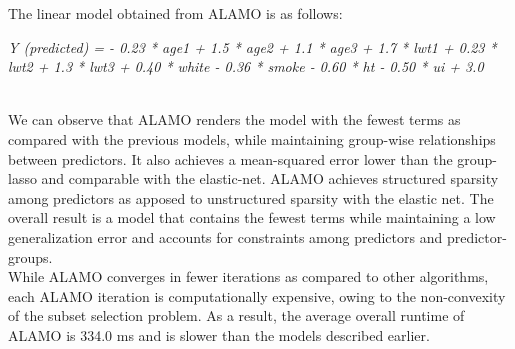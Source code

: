 \documentclass[a4paper,12pt]{article}
\begin{document}
\noindent The linear model obtained from ALAMO is as follows:
\\

\begin{center}
    \textit{Y (predicted) = - 0.23 * age1 + 1.5 * age2 + 1.1 * age3 + 1.7 * lwt1 + 0.23 * lwt2 + 1.3 * lwt3 + 0.40 * white - 0.36 * smoke - 0.60 * ht - 0.50 * ui + 3.0}
\end{center}

\\



\noindent We can observe that ALAMO renders the model with the fewest terms as compared with the previous models, while maintaining group-wise relationships between predictors. It also achieves a mean-squared error lower than the group-lasso and comparable with the elastic-net. ALAMO achieves structured sparsity among predictors as apposed to unstructured sparsity with the elastic net. The overall result is a model that contains the fewest terms while maintaining a low generalization error and accounts for constraints among predictors and predictor-groups. \\

\noindent While ALAMO converges in fewer iterations as compared to other algorithms, each ALAMO iteration is computationally expensive, owing to the non-convexity of the subset selection problem. As a result, the average overall runtime of ALAMO is 334.0 ms and is slower than the models described earlier.
\newpage
\end{document}
